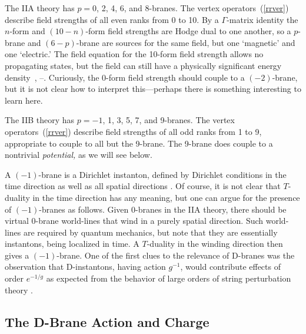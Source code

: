 \documentclass[12pt]{article}
\begin{document}
The IIA theory has $p = 0$, 2, 4, 6, and 8-branes.  The vertex
operators~(\ref{rrver}) describe field strengths of all even ranks from 0
to 10.  By a
$\Gamma$-matrix identity the $n$-form and $(10-n)$-form field strengths
are Hodge dual to one another, so a $p$-brane and $(6-p)$-brane are
sources for the same field, but one `magnetic' and one `electric.'  The field
equation for the 10-form field strength allows no propagating states, but
the field can still have a physically significant energy
density~\cite{joeone}, \cite{romans}--\cite{joeandy}. 
Curiously, the 0-form field strength should couple to a $(-2)$-brane, but it
is not clear how to interpret this---perhaps there is something interesting
to learn here. 

The IIB theory has $p = -1$, 1, 3, 5, 7, and 9-branes.  The vertex 
operators~(\ref{rrver}) describe field strengths of all odd ranks from 1 to
9, appropriate to couple to all but the 9-brane.  The 9-brane does couple to
a nontrivial {\it potential,} as we will see below.

A $(-1)$-brane is a
Dirichlet instanton, defined by Dirichlet conditions in the time direction
as well as all spatial directions \cite{parton}. Of course, it is not clear
that
$T$-duality in the time direction has any meaning, but one can argue for
the presence of $(-1)$-branes as follows.  Given $0$-branes in the IIA
theory, there should be virtual $0$-brane world-lines that wind in a
purely spatial direction.  Such world-lines are required by quantum
mechanics, but note that they are essentially instantons, being localized
in time.  A $T$-duality in the winding direction then gives a $(-1)$-brane.
One of the first clues to the relevance of D-branes \cite{joecomb} was the
observation that D-instantons, having action $g^{-1}$, would contribute
effects of order $e^{-1/g}$ as expected from the behavior of large orders of
string perturbation theory \cite{shenk1}.

\subsection{The D-Brane Action and Charge}
\end{document}
